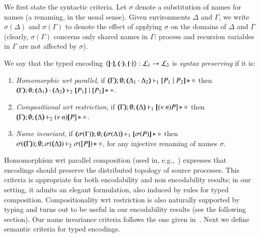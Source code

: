 We first state the 
syntactic criteria. 
Let $\sigma$ denote a substitution of names for names (a renaming, in the usual sense). Given environments $\Delta$ and $\Gamma$,
we write $\sigma(\Delta)$ and $\sigma(\Gamma)$ to denote the effect of applying $\sigma$ on the 
domains of $\Delta$ and $\Gamma$
(clearly, $\sigma(\Gamma)$ concerns only shared names in $\Gamma$: process and recursion variables in $\Gamma$ are not affected by $\sigma$). 



\begin{definition}\rm
	\label{def:sep}
	We say that 
	the typed encoding 
	$\enco{\map{\cdot}, \mapt{\cdot}, \mapa{\cdot}}: \tyl{L}_1 \to \tyl{L}_2$ is \emph{syntax preserving}
	if it is:
	
	\begin{enumerate}[1.]
		\item	\emph{Homomorphic wrt parallel},   if 
		$\mapt{\Gamma}; \emptyset; \mapt{\Delta_1 \cat \Delta_2} \proves_1 \map{P_1 \Par P_2} \hastype \Proc$
		then \\
		$\mapt{\Gamma}; \emptyset; \mapt{\Delta_1} \cat \mapt{\Delta_2} \proves_2 \map{P_1} \Par \map{P_2} \hastype \Proc$.

		\item	\emph{Compositional wrt restriction},  if 
		$\mapt{\Gamma}; \emptyset; \mapt{\Delta} \proves_1 \map{\news{n}P} \hastype \Proc$
		then \\
		$\mapt{\Gamma}; \emptyset; \mapt{\Delta} \proves_2 \news{n}\map{P} \hastype \Proc$.
		
		\item \emph{Name invariant},   if
		$\mapt{\sigma(\Gamma)}; \emptyset; \mapt{\sigma(\Delta)} \proves_1 \map{\sigma(P)} \hastype \Proc$
		then \\
		$\sigma(\mapt{\Gamma}); \emptyset; \sigma(\mapt{\Delta}) \proves_2 \sigma(\map{P}) \hastype \Proc$, 
		for any injective renaming  of names $\sigma$.
	\end{enumerate}
\end{definition}
Homomorphism wrt parallel composition (used in, e.g.,~\cite{Palamidessi03,DBLP:conf/lics/PalamidessiSVV06})
expresses that encodings should preserve the distributed topology of source processes. This criteria 
 is appropriate for both encodability and non encodability results; in our setting, 
it admits an elegant formulation, also induced by rules for typed composition.
Compositionality wrt restriction is 
also naturally supported by typing and turns out to be 
useful in our encodability results (see the following section).
Our name invariance criteria follows the one given in~\cite{DBLP:journals/iandc/Gorla10,DBLP:conf/icalp/LanesePSS10}. 
Next we define semantic criteria for typed encodings.

